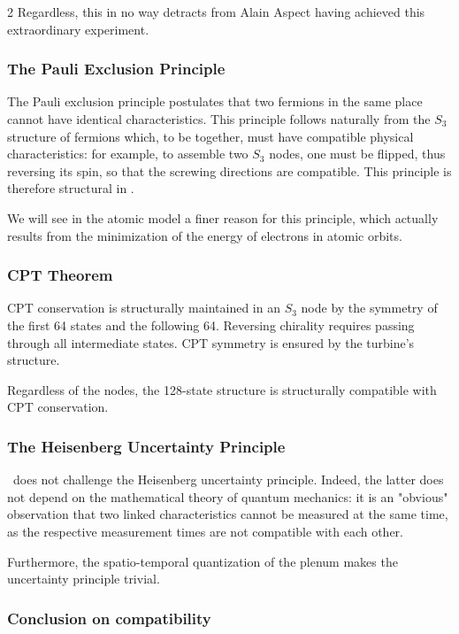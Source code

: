 \begin{multicols}{2}
	Regardless, this in no way detracts from Alain Aspect having achieved this extraordinary experiment.
	
	\subsubsection{The Pauli Exclusion Principle}
	
	The Pauli exclusion principle postulates that two fermions in the same place cannot have identical characteristics. This principle follows naturally from the $S_3$ structure of fermions which, to be together, must have compatible physical characteristics: for example, to assemble two $S_3$ nodes, one must be flipped, thus reversing its spin, so that the screwing directions are compatible. This principle is therefore structural in \PQ.
	
	We will see in the atomic model a finer reason for this principle, which actually results from the minimization of the energy of electrons in atomic orbits.
	
	\subsubsection{CPT Theorem}
	
	CPT conservation is structurally maintained in an $S_3$ node by the symmetry of the first 64 states and the following 64. Reversing chirality requires passing through all intermediate states. CPT symmetry is ensured by the turbine's structure.
	
	Regardless of the nodes, the 128-state structure is structurally compatible with CPT conservation.
	
	\subsubsection{The Heisenberg Uncertainty Principle}
	
	\PQ\ does not challenge the Heisenberg uncertainty principle. Indeed, the latter does not depend on the mathematical theory of quantum mechanics: it is an "obvious" observation that two linked characteristics cannot be measured at the same time, as the respective measurement times are not compatible with each other.
	
	Furthermore, the spatio-temporal quantization of the plenum makes the uncertainty principle trivial.
	
	\subsubsection{Conclusion on compatibility}
	

\end{multicols}
